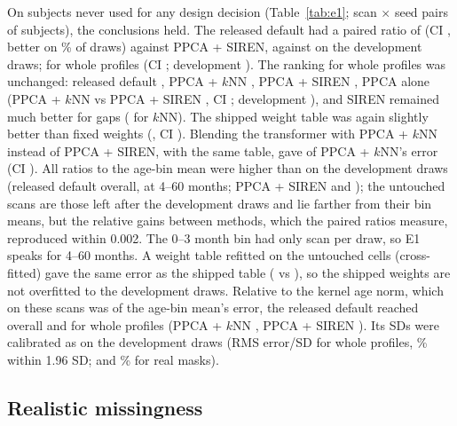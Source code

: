 \documentclass[11pt]{article}
\begin{document}
On subjects never used for any design decision (Table~\ref{tab:e1}; \eOnePairs{} scan $\times$ seed pairs of
\eOneSubjects{} subjects), the conclusions held. The released default had a paired ratio of \eOneFinalVsDef{} (CI
\eOneFinalVsDefCi, better on \eOneFinalVsDefBetter\% of draws) against PPCA + SIREN, against \cORatio{} on the
development draws; for whole profiles \eOneFinalVsDefWhole{} (CI \eOneFinalVsDefWholeCi; development \pcEWhole). The
ranking for whole profiles was unchanged: released default \eOneFinalWhole, PPCA + $k$NN \eOneKnnWhole, PPCA + SIREN
\eOneDefWhole, PPCA alone \eOnePpcaWhole{} (PPCA + $k$NN vs PPCA + SIREN \eOneKnnVsDefWhole, CI \eOneKnnVsDefWholeCi;
development \pcAWhole), and SIREN remained much better for gaps (\eOneKnnVsDefGap{} for $k$NN). The shipped weight table
was again slightly better than fixed weights (\eOneFinalVsFixed, CI \eOneFinalVsFixedCi). Blending the transformer with
PPCA + $k$NN instead of PPCA + SIREN, with the same table, gave \eOneFinalKnnVsKnn{} of PPCA + $k$NN's error (CI
\eOneFinalKnnVsKnnCi). All ratios to the age-bin mean were higher than on the development draws (released default
\eOneFinal{} overall, \eOneFinalOverallBC{} at 4--60 months; PPCA + SIREN \eOneDef{} and \eOneDefOverallBC); the
untouched scans are those left after the development draws and lie farther from their bin means, but the relative gains
between methods, which the paired ratios measure, reproduced within 0.002. The 0--3 month bin had only
\eOneScansBinA{} scan per draw, so E1 speaks for 4--60 months. A weight table refitted on the untouched cells (cross-fitted) gave the same error as
the shipped table (\eOneRefitDump{} vs \eOneShippedDump), so the shipped weights are not overfitted to the development
draws. Relative to the kernel age norm, which on these scans was \eOneKernelAlone{} of the age-bin mean's error, the released
default reached \eOneKFinal{} overall and \eOneKFinalWhole{} for whole profiles (PPCA + $k$NN \eOneKKnnWhole, PPCA + SIREN
\eOneKDefWhole). Its SDs were calibrated as on the development draws (RMS error/SD \eOneCalWhole{} for whole profiles,
\eOneCalWholeCov\% within 1.96 SD; \eOneCalReal{} and \eOneCalRealCov\% for real masks).

\subsection{Realistic missingness}\label{sec:real}
\end{document}
